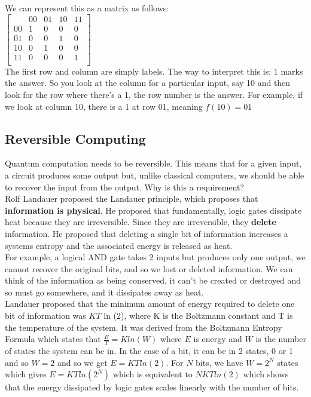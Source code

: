 \documentclass[11pt]{article} %
\begin{document}
We can represent this as a matrix as follows:\\

$
\begin{bmatrix}
& 00 & 01 & 10 & 11\\
00 &1 & 0 & 0 & 0\\
01 & 0 & 0 & 1 & 0\\
10 & 0& 1 & 0 & 0\\
11& 0& 0 & 0 & 1\\
\end{bmatrix}
$\\

\noindent The first row and column are simply labels. The way to interpret this is: 1 marks the answer. So you look at the column for a particular input, say 10 and then look for the row where there's a 1, the row number is the answer. For example, if we look at column 10, there is a 1 at row 01, meaning $f(10) = 01$

\subsection{Reversible Computing}{}
\noindent Quantum computation needs to be reversible. This means that for a given input, a circuit produces some output but, unlike classical computers, we should be able to recover the input from the output. Why is this a requirement?\\

\noindent Rolf Landauer proposed the Landauer principle, which proposes that \textbf{information is physical}. He proposed that fundamentally, logic gates dissipate heat because they are irreversible. Since they are irreversible, they \textbf{delete} information. He proposed that deleting a single bit of information increases a systems entropy and the associated energy is released as heat.\\

\noindent For example, a logical AND gate takes 2 inputs but produces only one output, we cannot recover the original bits, and so we lost or deleted information.  We can think of the information as being conserved, it can't be created or destroyed and so must go somewhere, and it dissipates away as heat.\\

\noindent Landauer proposed that the minimum amount of energy required to delete one bit of information was $K T$ ln (2), where K is the Boltzmann constant and T is the temperature of the system. It was derived from the Boltzmann Entropy Formula which states that $\frac{E}{T} = K ln(W)$ where $E$ is energy and $W$ is the number of states the system can be in. In the case of a bit, it can be in 2 states, 0 or 1 and so $W = 2$ and so we get $E = K T ln(2)$. For $N$ bits, we have $W = 2^{N}$ states which gives $E = K T ln(2^N)$ which is equivalent to $N K T ln (2)$ which shows that the energy dissipated by logic gates scales linearly with the number of bits.\\
\end{document}
